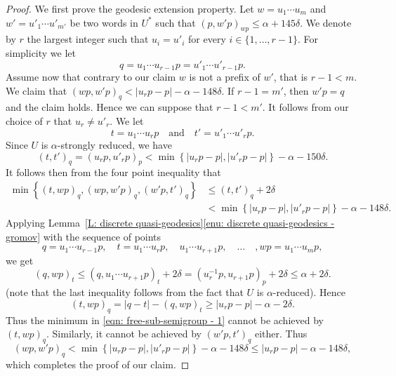 \documentclass[JEP,XML,SOM,Unicode, NoEqCountersInSection,published]{cedram}
\theoremstyle{plain}
\theoremstyle{definition}
\begin{document}
\begin{proof}
We first prove the geodesic extension property.
Let $w = u_1\cdots u_m$ and $w' = u'_1\cdots u'_{m'}$ be two words in $U^*$ such that $(p, w'p)_{wp} \leq \alpha +145\delta$.
We denote by $r$ the largest integer such that $u_i = u'_i$ for every $i \in \{1, \dots, r-1\}$.
For simplicity we let
\begin{equation*}
q = u_1\cdots u_{r-1} p = u'_1 \cdots u'_{r-1}p.
\end{equation*}
Assume now that contrary to our claim $w$ is not a prefix of $w'$, that is $r - 1 < m$.
We claim that $(wp, w'p)_q < |u_rp - p| - \alpha - 148\delta$.
If $r-1 = m'$, then $w'p = q$ and the claim holds.
Hence we can suppose that $r-1 < m'$.
It follows from our choice of $r$ that $u_r \neq u'_r$.
We let
\begin{equation*}
t = u_1\cdots u_rp
\quad \text{and} \quad
t' = u'_1 \cdots u'_rp.
\end{equation*}
Since $U$ is $\alpha$-strongly reduced, we have
\begin{equation*}
\left(t,t'\right)_q = (u_rp, u'_rp)_p < \min \left\{ |u_rp -p|, |u'_rp - p|\right\} - \alpha - 150\delta.
\end{equation*}
It follows then from the four point inequality that
\begin{equation} \label{eqn: free-sub-semigroup - 1}
\begin{split}
\min\left\{ (t,wp)_q, (wp,w'p)_q, (w'p,t')_q\right\} & \leq (t,t')_q +2\delta
\\& < \min \left\{ |u_rp -p|, |u'_rp - p|\right\} - \alpha - 148\delta.
\end{split}
\end{equation}
Applying Lemma~\ref{L: discrete quasi-geodesics}\eqref{enu: discrete quasi-geodesics - gromov} with the sequence of points
\begin{equation*}
q = u_1\cdots u_{r-1}p, \quad t = u_1\cdots u_rp, \quad u_1\cdots u_{r+1}p, \quad\dots\quad, wp = u_1\cdots u_mp,
\end{equation*}
we get
\begin{equation*}
(q,wp)_t \leq (q, u_1\cdots u_{r+1}p)_t + 2 \delta
= (u_r^{-1}p, u_{r+1}p)_p + 2 \delta
\leq \alpha + 2\delta.
\end{equation*}
(note that the last inequality follows from the fact that $U$ is $\alpha$-reduced).
Hence
\begin{equation*}
(t,wp)_q = |q-t| - (q,wp)_t \geq |u_rp - p| - \alpha - 2\delta.
\end{equation*}
Thus the minimum in \eqref{eqn: free-sub-semigroup - 1} cannot be achieved by $(t,wp)_q$.
Similarly, it cannot be achieved by $(w'p,t')_q$ either.
Thus
\begin{equation*}
\left(wp,w'p\right)_q < \min \left\{ |u_rp -p|, |u'_rp - p|\right\} - \alpha - 148\delta \leq |u_rp - p| - \alpha - 148\delta,
\end{equation*}
which completes the proof of our claim.


\end{proof}
\end{document}
